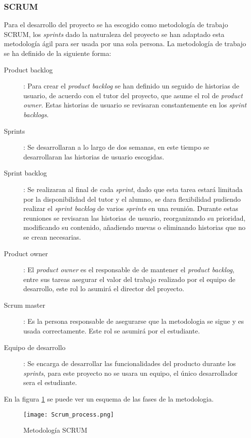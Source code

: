 \subsubsection{SCRUM}
Para el desarrollo del proyecto se ha escogido como metodología de trabajo SCRUM, los \textit{sprints} dado la naturaleza del proyecto se han adaptado esta metodología ágil para ser usada por una sola persona. La metodología de trabajo se ha definido de la siguiente forma:
\begin{description}
	\item[Product backlog]:
	\linebreak Para crear el \textit{product backlog} se han definido un seguido de historias de usuario, de acuerdo con el tutor del proyecto, que asume el rol de \textit{product owner}. Estas historias de usuario se revisaran constantemente en los \textit{sprint backlogs}.
	\item[Sprints]:
	\linebreak Se desarrollaran a lo largo de dos semanas, en este tiempo se desarrollaran las historias de usuario escogidas.
	\item[Sprint backlog]:
	\linebreak Se realizaran al final de cada \textit{sprint}, dado que esta tarea estará limitada por la disponibilidad del tutor y el alumno, se dara flexibilidad pudiendo realizar el \textit{sprint backlog} de varios \textit{sprints} en una reunión. Durante estas reuniones se revisaran las historias de usuario, reorganizando su prioridad, modificando su contenido, añadiendo nuevas o eliminando historias que no se crean necesarias.
	\item[Product owner]:
	\linebreak El \textit{product owner} es el responsable de de mantener el \textit{product backlog}, entre sus tareas asegurar el valor del trabajo realizado por el equipo de desarrollo, este rol lo asumirá el director del proyecto.
	\item[Scrum master]:
	\linebreak Es la persona responsable de asegurarse que la metodologia se sigue y es usada correctamente. Este rol se asumirá por el estudiante.
	\item[Equipo de desarrollo]:
	\linebreak Se encarga de desarrollar las funcionalidades del producto durante los \textit{sprints}, para este proyecto no se usara un equipo, el único desarrollador sera el estudiante.
\end{description}
En la figura \ref{fig:scrum} se puede ver un esquema de las fases de la metodologia.
\begin{figure}[ht!]
	\center
	\texttt{[image: Scrum\_process.png]}
	\caption{Metodología SCRUM}
	\label{fig:scrum}
\end{figure}

